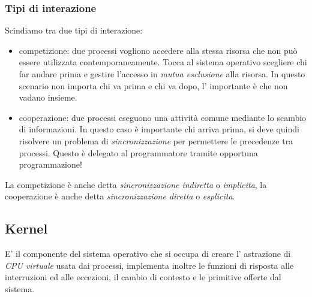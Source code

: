 \subsubsection{Tipi di interazione}
Scindiamo tra due tipi di interazione:
\begin{itemize}
    \item competizione: due processi vogliono accedere alla stessa risorsa che non può essere utilizzata contemporaneamente.
    Tocca al sistema operativo scegliere chi far andare prima e gestire l'accesso in \emph{mutua esclusione} alla risorsa.
    In questo scenario non importa chi va prima e chi va dopo, l' importante è che non vadano insieme.
    
    \item cooperazione: due processi eseguono una attività comune mediante lo scambio di informazioni.
    In questo caso è importante chi arriva prima, si deve quindi risolvere un problema di \emph{sincronizzazione} per permettere le precedenze tra processi.
    Questo è delegato al programmatore tramite opportuna programmazione!
\end{itemize}
La competizione è anche detta \emph{sincronizzazione indiretta} o \emph{implicita}, la cooperazione è anche detta \emph{sincronizzazione diretta} o \emph{esplicita}.

\subsection{Kernel}
E' il componente del sistema operativo che si occupa di creare l' astrazione di \emph{CPU virtuale} usata dai processi, implementa inoltre le funzioni di risposta alle interruzioni ed alle eccezioni, il cambio di contesto e le primitive offerte dal sistema.


